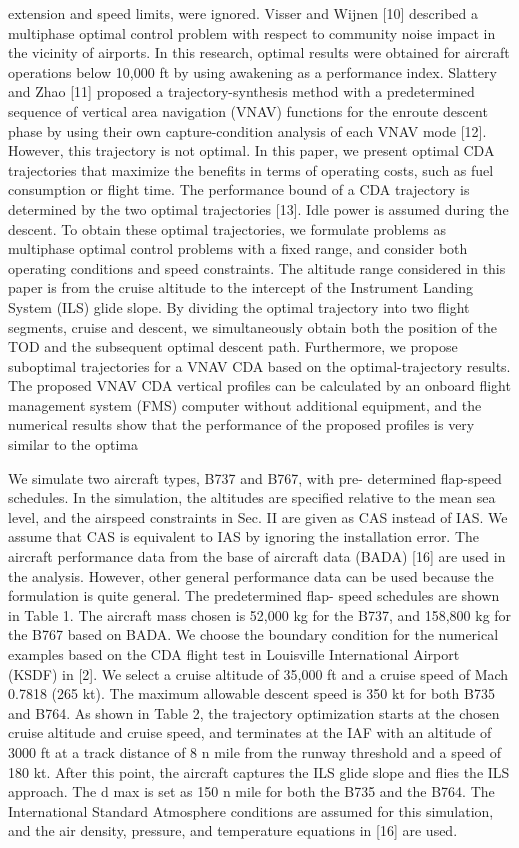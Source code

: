 \documentclass{aer1315-pretty}
\begin{document}
\begin{itemize}
extension and speed limits, were ignored. Visser and Wijnen [10] described a multiphase optimal control problem with respect to community noise impact in the vicinity of airports. In this research, optimal results were obtained for aircraft operations below 10,000 ft by using awakening as a performance index. Slattery and Zhao [11] proposed a trajectory-synthesis method with a predetermined sequence of vertical area navigation (VNAV) functions for the enroute descent phase by using their own capture-condition analysis of each VNAV mode [12]. However, this trajectory is not optimal. In this paper, we present optimal CDA trajectories that maximize the benefits in terms of operating costs, such as fuel consumption or flight time. The performance bound of a CDA trajectory is determined by the two optimal trajectories [13]. Idle power is assumed during the descent. To obtain these optimal trajectories, we formulate problems as multiphase optimal control problems with a fixed range, and consider both operating conditions and speed constraints. The altitude range considered in this paper is from the cruise altitude to the intercept of the Instrument Landing System (ILS) glide slope. By dividing the optimal trajectory into two flight segments, cruise and descent, we simultaneously obtain both the position of the TOD and the subsequent optimal descent path. Furthermore, we propose suboptimal trajectories for a VNAV CDA based on the optimal-trajectory results. The proposed VNAV CDA vertical profiles can be calculated by an onboard flight management system (FMS) computer without additional equipment, and the numerical results show that the performance of the proposed profiles is very similar to the optima


We simulate two aircraft types, B737 and B767, with pre-
determined flap-speed schedules. In the simulation, the altitudes are
specified relative to the mean sea level, and the airspeed constraints in
Sec. II are given as CAS instead of IAS. We assume that CAS is
equivalent to IAS by ignoring the installation error. The aircraft
performance data from the base of aircraft data (BADA) [16] are used
in the analysis. However, other general performance data can be used
because the formulation is quite general. The predetermined flap-
speed schedules are shown in Table 1. The aircraft mass chosen is
52,000 kg for the B737, and 158,800 kg for the B767 based on
BADA.
We choose the boundary condition for the numerical examples
based on the CDA flight test in Louisville International Airport
(KSDF) in [2]. We select a cruise altitude of 35,000 ft and a cruise
speed of Mach 0.7818 (265 kt). The maximum allowable descent
speed is 350 kt for both B735 and B764. As shown in Table 2, the
trajectory optimization starts at the chosen cruise altitude and cruise
speed, and terminates at the IAF with an altitude of 3000 ft at a track
distance of 8 n mile from the runway threshold and a speed of 180 kt.
After this point, the aircraft captures the ILS glide slope and flies
the ILS approach. The d max is set as 150 n mile for both the B735
and the B764. The International Standard Atmosphere conditions
are assumed for this simulation, and the air density, pressure, and
temperature equations in [16] are used.


\end{itemize}
\end{document}
